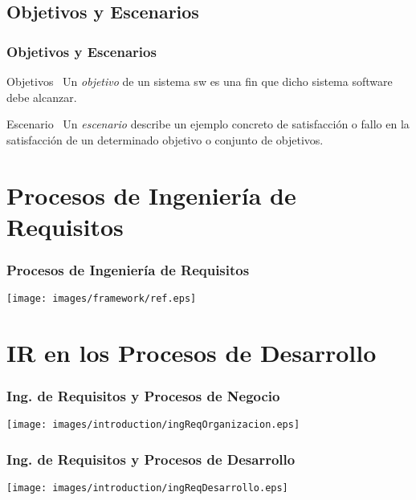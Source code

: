 \documentclass[a4paper,slidestop,xcolor=pst,dvips,blue]{beamer}
\begin{document}
\subsection{Objetivos y Escenarios}

\begin{frame}
    \frametitle{Objetivos y Escenarios}
    \begin{block}{Objetivos~\cite{lamsweerde:2001}}
        Un \alert{\emph{objetivo}} de un sistema sw es una fin que dicho sistema software debe alcanzar. 
    \end{block}
     {
        \begin{block}{Escenario~\cite{pohl:2010}}
            Un \alert{\emph{escenario}} describe un ejemplo concreto de satisfacción o fallo en la satisfacción de un determinado objetivo o conjunto de objetivos.
        \end{block}
    }
\end{frame}

\section{Procesos de Ingeniería de Requisitos}

\begin{frame}[c]
    \frametitle{Procesos de Ingeniería de Requisitos}
    \begin{center}
		\texttt{[image: images/framework/ref.eps]}
    \end{center}
\end{frame}

\section{IR en los Procesos de Desarrollo}

\begin{frame}[c]
    \frametitle{Ing. de Requisitos y Procesos de Negocio}
    \begin{center}
			\texttt{[image: images/introduction/ingReqOrganizacion.eps]}
    \end{center}
\end{frame}

\begin{frame}
    \frametitle{Ing. de Requisitos y Procesos de Desarrollo}
    \begin{center}
			\texttt{[image: images/introduction/ingReqDesarrollo.eps]}
    \end{center}
\end{frame}
\end{document}
